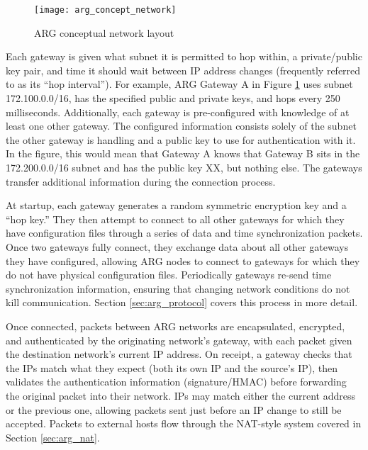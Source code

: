 \begin{figure}
	\centering
	\texttt{[image: arg\_concept\_network]}
	\caption{\ac{ARG} conceptual network layout}
	\label{fig:arg_concept_network}
\end{figure}

\par Each gateway is given what subnet it is permitted to hop within, a private/public key pair, and time it should wait between \ac{IP} address changes (frequently referred to as its ``hop interval''). For example, \ac{ARG} Gateway A in Figure \ref{fig:arg_concept_network} uses subnet 172.100.0.0/16, has the specified public and private keys, and hops every 250 milliseconds. Additionally, each gateway is pre-configured with knowledge of at least one other gateway. The configured information consists solely of the subnet the other gateway is handling and a public key to use for authentication with it. In the figure, this would mean that Gateway A knows that Gateway B sits in the 172.200.0.0/16 subnet and has the public key XX, but nothing else. The gateways transfer additional information during the connection process. 

\par {} At startup, each gateway generates a random symmetric encryption key and a ``hop key.'' They then attempt to connect to all other gateways for which they have configuration files through a series of data and time synchronization packets. Once two gateways fully connect, they exchange data about all other gateways they have configured, allowing \ac{ARG} nodes to connect to gateways for which they do not have physical configuration files. Periodically gateways re-send time synchronization information, ensuring that changing network conditions do not kill communication. Section \ref{sec:arg_protocol} covers this process in more detail.

\par Once connected, packets between ARG networks are encapsulated, encrypted, and authenticated by the originating network's gateway, with each packet given the destination network's current \ac{IP} address. On receipt, a gateway checks that the \acp{IP} match what they expect (both its own IP and the source's IP), then validates the authentication information (signature/\ac{HMAC}) before forwarding the original packet into their network. \acp{IP} may match either the current address or the previous one, allowing packets sent just before an \ac{IP} change to still be accepted. Packets to external hosts flow through the \ac{NAT}-style system covered in Section \ref{sec:arg_nat}. 

